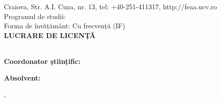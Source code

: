 \documentclass[12pt,a4paper,oneside]{report}
\begin{document}
\begin{titlepage}
    \centering
    {\large \textbf{\Universitate}}\\[0.2cm]
    {\large \textbf{\Facultate}}\\[0.2cm]
    {\small Craiova, Str. A.I. Cuza, nr. 13, tel: +40-251-411317, http://feaa.ucv.ro}\\[1.5cm]

    {\large Programul de studii: \textbf{\Specializare}}\\[0.2cm]
    {\large Forma de învățământ: Cu frecvență (IF)}\\[2.0cm]

    {\LARGE \textbf{LUCRARE DE LICENȚĂ}}\\[1.0cm]
    {\Large \textbf{\TitluLicenta}}\\[3.5cm]

    \begin{minipage}{0.48\textwidth}
        \begin{flushleft} \large
            \textbf{Coordonator științific:}\\
            \CoordonatorLicenta
        \end{flushleft}
    \end{minipage}
    \hfill
    \begin{minipage}{0.48\textwidth}
        \begin{flushright} \large
            \textbf{Absolvent:}\\
            \AutorLicenta
        \end{flushright}
    \end{minipage}

    \vfill
    {\large \Oras, \Anul}
\end{titlepage}

\tableofcontents
\newpage










\end{document}
